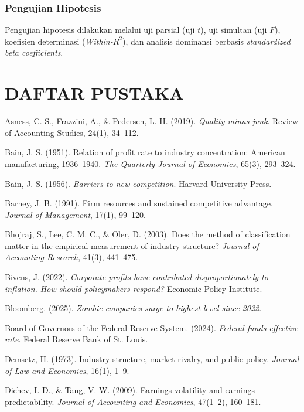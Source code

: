 \documentclass[12pt,a4paper]{report}
\begin{document}
\subsection{Pengujian Hipotesis}

Pengujian hipotesis dilakukan melalui uji parsial (uji $t$), uji simultan (uji $F$), koefisien determinasi (\textit{Within-$R^2$}), dan analisis dominansi berbasis \textit{standardized beta coefficients}.

\chapter*{DAFTAR PUSTAKA}

\begin{flushleft}
Asness, C. S., Frazzini, A., \& Pedersen, L. H. (2019). \textit{Quality minus junk}. Review of Accounting Studies, 24(1), 34--112.\par
Bain, J. S. (1951). Relation of profit rate to industry concentration: American manufacturing, 1936--1940. \textit{The Quarterly Journal of Economics}, 65(3), 293--324.\par
Bain, J. S. (1956). \textit{Barriers to new competition}. Harvard University Press.\par
Barney, J. B. (1991). Firm resources and sustained competitive advantage. \textit{Journal of Management}, 17(1), 99--120.\par
Bhojraj, S., Lee, C. M. C., \& Oler, D. (2003). Does the method of classification matter in the empirical measurement of industry structure? \textit{Journal of Accounting Research}, 41(3), 441--475.\par
Bivens, J. (2022). \textit{Corporate profits have contributed disproportionately to inflation. How should policymakers respond?} Economic Policy Institute.\par
Bloomberg. (2025). \textit{Zombie companies surge to highest level since 2022}.\par
Board of Governors of the Federal Reserve System. (2024). \textit{Federal funds effective rate}. Federal Reserve Bank of St. Louis.\par
Demsetz, H. (1973). Industry structure, market rivalry, and public policy. \textit{Journal of Law and Economics}, 16(1), 1--9.\par
Dichev, I. D., \& Tang, V. W. (2009). Earnings volatility and earnings predictability. \textit{Journal of Accounting and Economics}, 47(1--2), 160--181.\par

\end{flushleft}
\end{document}
